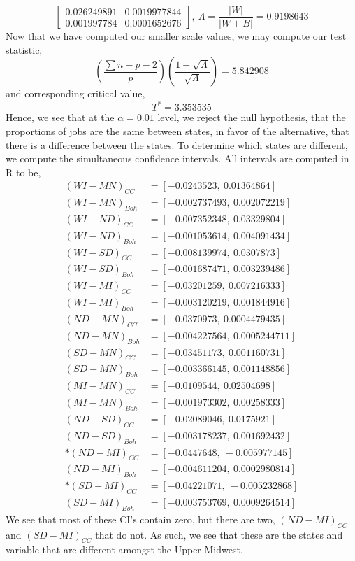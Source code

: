 \documentclass[letterpaper,10pt]{article}
\begin{document}
\begin{enumerate}
\[\begin{bmatrix}
0.026249891 & 0.0019977844\\
0.001997784 & 0.0001652676
\end{bmatrix},\ \Lambda=\frac{|W|}{|W+B|}=0.9198643 \]
Now that we have computed our smaller scale values, we may compute our test statistic,
\[\left(\frac{\sum n-p-2}{p}\right)\left(\frac{1-\sqrt{\Lambda}}{\sqrt{\Lambda}}\right)=5.842908\]
and corresponding critical value,
\[T^*=3.353535\]
Hence, we see that at the $\alpha=0.01$ level, we reject the null hypothesis, that the proportions of jobs are the same between states, in favor of the alternative, that there is a difference between the states. To determine which states are different, we compute the simultaneous confidence intervals. All intervals are computed in R to be,
\begin{align*}
(WI-MN)_{CC} &= [-0.0243523,\ 0.01364864]\\
(WI-MN)_{Boh} &= [-0.002737493,\ 0.002072219]\\
(WI-ND)_{CC} &= [-0.007352348,\ 0.03329804]\\
(WI-ND)_{Boh} &= [-0.001053614,\ 0.004091434]\\
(WI-SD)_{CC} &= [-0.008139974,\ 0.0307873]\\
(WI-SD)_{Boh} &= [-0.001687471,\ 0.003239486]\\
(WI-MI)_{CC} &= [-0.03201259,\ 0.007216333]\\
(WI-MI)_{Boh} &= [-0.003120219,\ 0.001844916]\\
(ND-MN)_{CC} &= [-0.0370973,\ 0.0004479435]\\
(ND-MN)_{Boh} &= [-0.004227564,\ 0.0005244711]\\
(SD-MN)_{CC} &= [-0.03451173,\ 0.001160731]\\
(SD-MN)_{Boh} &= [-0.003366145,\ 0.001148856]\\
(MI-MN)_{CC} &= [-0.0109544,\ 0.02504698]\\
(MI-MN)_{Boh} &= [-0.001973302,\ 0.00258333]\\
(ND-SD)_{CC} &= [-0.02089046,\ 0.0175921]\\
(ND-SD)_{Boh} &= [-0.003178237,\ 0.001692432]\\
*(ND-MI)_{CC} &= [-0.0447648,\ -0.005977145]\\
(ND-MI)_{Boh} &= [-0.004611204,\ 0.0002980814]\\
*(SD-MI)_{CC} &= [-0.04221071,\ -0.005232868]\\
(SD-MI)_{Boh} &= [-0.003753769,\ 0.0009264514]
\end{align*}
We see that most of these CI's contain zero, but there are two, $(ND-MI)_{CC}$ and $(SD-MI)_{CC}$ that do not. As such, we see that these are the states and variable that are different amongst the Upper Midwest.

\end{enumerate}
\end{document}
